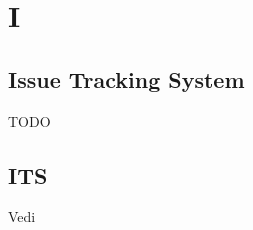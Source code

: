 \section{I}

\vspace{2em}
\subsection*{Issue Tracking System}
TODO

\vspace{2em}
\subsection*{ITS}
\par Vedi 
